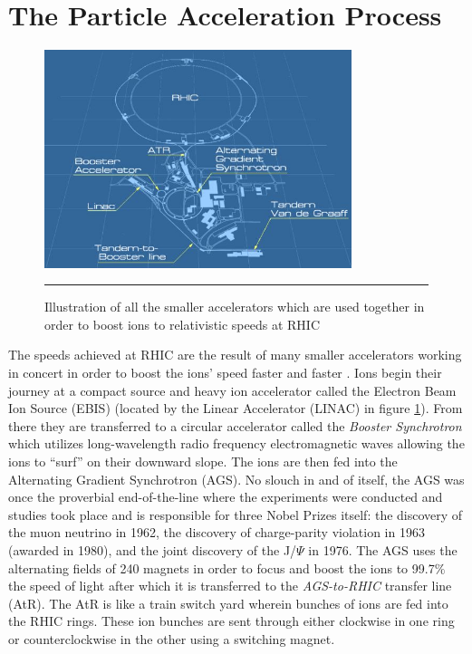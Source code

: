 \section{The Particle Acceleration Process}
\begin{figure}[htbp]
  \centering
    \includegraphics[width=0.8\textwidth]{Figures/RHICdiagram.JPG}
    \rule{35em}{0.5pt}
  \caption[Illustration of all the accelerators used to boost ions to relativistic speeds at RHIC]{Illustration of all the smaller accelerators which are used together in order to boost ions to relativistic speeds at RHIC}
  \label{fig:RHICdiagram}
\end{figure}
The speeds achieved at RHIC are the result of many smaller accelerators working in concert in order to boost the ions' speed faster and faster \citep{RHICaccel}.  Ions begin their journey at a compact source and heavy ion accelerator called the Electron Beam Ion Source (EBIS) (located by the Linear Accelerator (LINAC) in figure \ref{fig:RHICdiagram}). From there they are transferred to a circular accelerator called the \textit{Booster Synchrotron} which utilizes long-wavelength radio frequency electromagnetic waves allowing the ions to ``surf'' on their downward slope. The ions are then fed into the Alternating Gradient Synchrotron (AGS). No slouch in and of itself, the AGS was once the proverbial end-of-the-line where the experiments were conducted and studies took place and is responsible for three Nobel Prizes itself: the discovery of the muon neutrino in 1962, the discovery of charge-parity violation in 1963 (awarded in 1980), and the joint discovery of the J/$\Psi$ in 1976. The AGS uses the alternating fields of 240 magnets in order to focus and boost the ions to 99.7$\%$ the speed of light after which it is transferred to the \textit{AGS-to-RHIC} transfer line (AtR). The AtR is like a train switch yard wherein bunches of ions are fed into the RHIC rings. These ion bunches are sent through either clockwise in one ring or counterclockwise in the other using a switching magnet.

